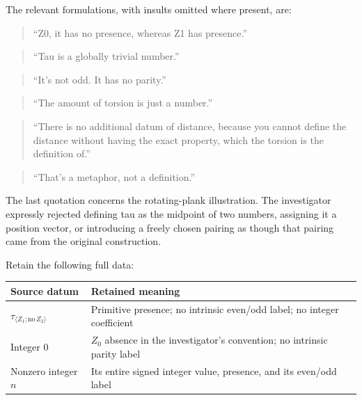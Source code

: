 \documentclass[
]{article}
\newcounter{none} %
\begin{document}
The relevant formulations, with insults omitted where present, are:

\begin{quote}
``Z0, it has no presence, whereas Z1 has presence.''
\end{quote}

\begin{quote}
``Tau is a globally trivial number.''
\end{quote}

\begin{quote}
``It's not odd. It has no parity.''
\end{quote}

\begin{quote}
``The amount of torsion is just a number.''
\end{quote}

\begin{quote}
``There is no additional datum of distance, because you cannot define
the distance without having the exact property, which the torsion is the
definition of.''
\end{quote}

\begin{quote}
``That's a metaphor, not a definition.''
\end{quote}

The last quotation concerns the rotating-plank illustration. The
investigator expressly rejected defining tau as the midpoint of two
numbers, assigning it a position vector, or introducing a freely chosen
pairing as though that pairing came from the original construction.

Retain the following full data:

{\def\LTcaptype{none} %
\begin{longtable}[]{@{}
  >{\raggedright\arraybackslash}p{}
  >{\raggedright\arraybackslash}p{}@{}}
\toprule\noalign{}
\begin{minipage}[b]{\linewidth}\raggedright
Source datum
\end{minipage} & \begin{minipage}[b]{\linewidth}\raggedright
Retained meaning
\end{minipage} \\
\midrule\noalign{}
\endhead
\bottomrule\noalign{}
\endlastfoot
\(\tau_{\langle Z_1;\mathrm{no}\,Z_2\rangle}\) & Primitive presence; no
intrinsic even/odd label; no integer coefficient \\
Integer \(0\) & \(Z_0\) absence in the investigator's convention; no
intrinsic parity label \\
Nonzero integer \(n\) & Its entire signed integer value, presence, and
its even/odd label \\
\end{longtable}
}
\end{document}
